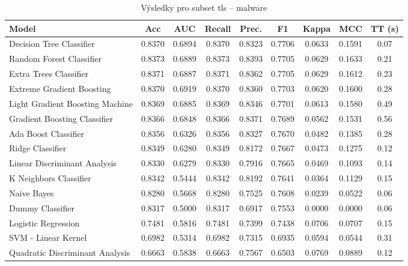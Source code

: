 \begin{table}[H]
  \centering
  \small
  \caption{Výsledky pro subset tls – malware}
  \begin{tabular}{|l|c|c|c|c|c|c|c|c|}
    \hline
    \textbf{Model} & \textbf{Acc} & \textbf{AUC} & \textbf{Recall} & \textbf{Prec.} & \textbf{F1} & \textbf{Kappa} & \textbf{MCC} & \textbf{TT (s)} \\
    \hline
    Decision Tree Classifier & 0.8370 & 0.6894 & 0.8370 & 0.8323 & 0.7706 & 0.0633 & 0.1591 & 0.07 \\
    Random Forest Classifier & 0.8373 & 0.6889 & 0.8373 & 0.8393 & 0.7705 & 0.0629 & 0.1633 & 0.21 \\
    Extra Trees Classifier & 0.8371 & 0.6887 & 0.8371 & 0.8362 & 0.7705 & 0.0629 & 0.1612 & 0.23 \\
    Extreme Gradient Boosting & 0.8370 & 0.6919 & 0.8370 & 0.8360 & 0.7703 & 0.0620 & 0.1600 & 0.28 \\
    Light Gradient Boosting Machine & 0.8369 & 0.6885 & 0.8369 & 0.8346 & 0.7701 & 0.0613 & 0.1580 & 0.49 \\
    Gradient Boosting Classifier & 0.8366 & 0.6848 & 0.8366 & 0.8371 & 0.7689 & 0.0562 & 0.1531 & 0.56 \\
    Ada Boost Classifier & 0.8356 & 0.6326 & 0.8356 & 0.8327 & 0.7670 & 0.0482 & 0.1385 & 0.28 \\
    Ridge Classifier & 0.8349 & 0.6280 & 0.8349 & 0.8172 & 0.7667 & 0.0473 & 0.1275 & 0.12 \\
    Linear Discriminant Analysis & 0.8330 & 0.6279 & 0.8330 & 0.7916 & 0.7665 & 0.0469 & 0.1093 & 0.14 \\
    K Neighbors Classifier & 0.8342 & 0.5444 & 0.8342 & 0.8192 & 0.7641 & 0.0364 & 0.1129 & 0.15 \\
    Naive Bayes & 0.8280 & 0.5668 & 0.8280 & 0.7525 & 0.7608 & 0.0239 & 0.0522 & 0.06 \\
    Dummy Classifier & 0.8317 & 0.5000 & 0.8317 & 0.6917 & 0.7553 & 0.0000 & 0.0000 & 0.06 \\
    Logistic Regression & 0.7481 & 0.5816 & 0.7481 & 0.7399 & 0.7438 & 0.0706 & 0.0707 & 0.15 \\
    SVM - Linear Kernel & 0.6982 & 0.5314 & 0.6982 & 0.7315 & 0.6935 & 0.0594 & 0.0544 & 0.31 \\
    Quadratic Discriminant Analysis & 0.6663 & 0.5838 & 0.6663 & 0.7567 & 0.6503 & 0.0769 & 0.0889 & 0.12 \\
    \hline
  \end{tabular}
\end{table}
\vspace{0.5cm}

